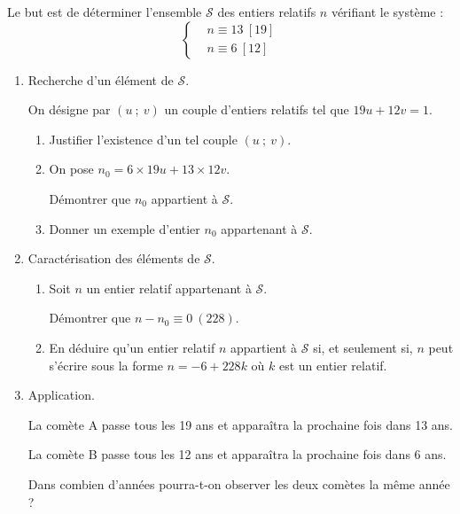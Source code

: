 \documentclass{cornouaille}
\begin{document}
\begin{exercice}

Le but est de déterminer l'ensemble $\mathcal{S}$ des entiers relatifs $n$ vérifiant le système :
$$\left\{\begin{aligned}
				&n\equiv13\ [19]\\
				&n\equiv6\ [12]\end{aligned}\right.$$
\begin{enumerate}				
\item Recherche d'un élément de $\mathcal{S}$.

On désigne par $(u\ ;\ v)$ un couple d'entiers relatifs tel que $19u+12v=1$.
\begin{enumerate}
\item Justifier l'existence d'un tel couple $(u\ ;\ v)$.

\item On pose $n_0=6\times19u+13\times12v$.

Démontrer que $n_0$ appartient à $\mathcal{S}$.

\item Donner un exemple d'entier $n_0$ appartenant à $\mathcal{S}$.
\end{enumerate}

\item Caractérisation des éléments de $\mathcal{S}$.
\begin{enumerate}
\item Soit $n$ un entier relatif appartenant à $\mathcal{S}$.
 
Démontrer que $n-n_0\equiv0~(228)$.

\item En déduire qu'un entier relatif $n$ appartient à $\mathcal{S}$
  si, et seulement si, $n$ peut s'écrire sous la forme $n=-6+228k$ où
  $k$ est un entier relatif.
\end{enumerate}
\item Application.

  La comète A passe tous les 19 ans et apparaîtra la prochaine fois
  dans 13 ans.

  La comète B passe tous les 12 ans et apparaîtra la prochaine fois
  dans 6 ans.

  Dans combien d'années pourra-t-on observer les deux comètes la même
  année ?
\end{enumerate}
\end{exercice}

\medskip

\end{document}

